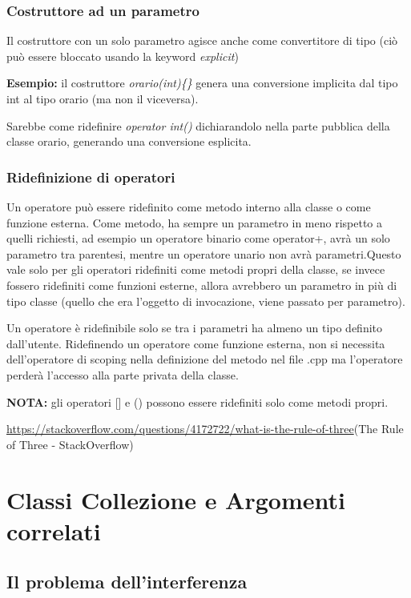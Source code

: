 \subsection{Costruttore ad un parametro}
Il costruttore con un solo parametro agisce anche come convertitore di tipo (ciò può essere bloccato usando la keyword \textit{explicit}) 

\textbf{Esempio:} il costruttore \textit{orario(int)\{\}} genera una conversione implicita dal tipo int al tipo orario (ma non il viceversa).

Sarebbe come ridefinire \textit{operator int()} dichiarandolo nella parte pubblica della classe orario, generando una conversione esplicita.

\subsection{Ridefinizione di operatori}
Un operatore può essere ridefinito come metodo interno alla classe o come funzione esterna.
Come metodo, ha sempre un parametro in meno rispetto a quelli richiesti, ad esempio un operatore binario come operator+, avrà un solo parametro tra parentesi, mentre
un operatore unario non avrà parametri.Questo vale solo per gli operatori ridefiniti come metodi propri della classe, se invece fossero ridefiniti come funzioni esterne, allora avrebbero un parametro in più di tipo classe (quello che era l'oggetto di invocazione, viene passato per parametro).

Un operatore è ridefinibile solo se tra i parametri ha almeno un tipo definito dall'utente.
Ridefinendo un operatore come funzione esterna, non si necessita dell'operatore di scoping nella definizione del metodo nel file .cpp ma l'operatore perderà l'accesso alla parte privata della classe.

\textbf{NOTA:} gli operatori [] e () possono essere ridefiniti solo come metodi propri.

\url{https://stackoverflow.com/questions/4172722/what-is-the-rule-of-three}(The Rule of Three - StackOverflow)

\newpage
\chapter{Classi Collezione e Argomenti correlati}

\section{Il problema dell'interferenza}

